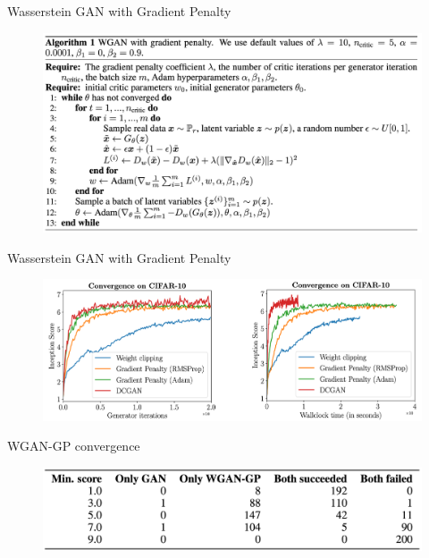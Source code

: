 \documentclass{beamer}
\begin{document}
\begin{frame}{Wasserstein GAN with Gradient Penalty}
	
	\begin{figure}
		\centering
		\includegraphics[width=1.0\linewidth]{figs/wgan_gp_pseudocode}
	\end{figure}

\end{frame}
\begin{frame}{Wasserstein GAN with Gradient Penalty}
	\begin{figure}
		\centering
		\includegraphics[width=\linewidth]{figs/wgan_gp_convergence}
	\end{figure}
	\begin{block}{WGAN-GP convergence}
		\begin{figure}
			\centering
			\includegraphics[width=0.75\linewidth]{figs/wgan_gp_wgan}
		\end{figure}
	\end{block}
	
\end{frame}
\end{document}
